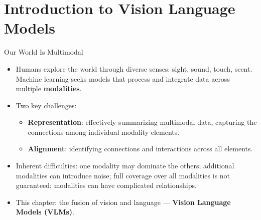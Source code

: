 \section{Introduction to Vision Language Models}

\begin{frame}{Our World Is Multimodal}
\begin{itemize}
  \item Humans explore the world through diverse senses: sight, sound, touch, scent. Machine learning seeks models that process and integrate data across multiple \textbf{modalities}.
  \item Two key challenges:
  \begin{itemize}
    \item \textbf{Representation}: effectively summarizing multimodal data, capturing the connections among individual modality elements.
    \item \textbf{Alignment}: identifying connections and interactions across all elements.
  \end{itemize}
  \item Inherent difficulties: one modality may dominate the others; additional modalities can introduce noise; full coverage over all modalities is not guaranteed; modalities can have complicated relationships.
  \item This chapter: the fusion of vision and language --- \textbf{Vision Language Models (VLMs)}.
\end{itemize}
\end{frame}

